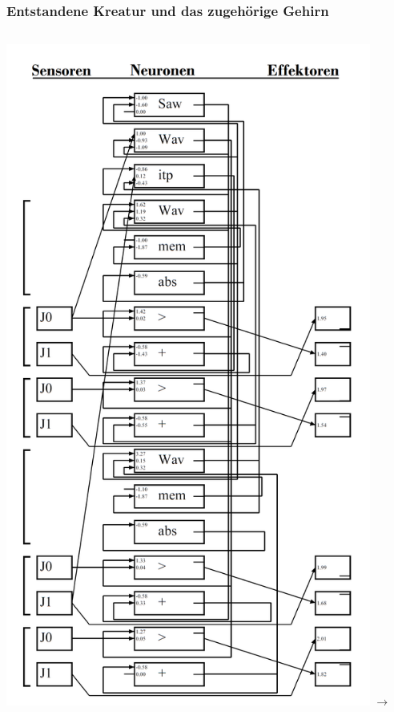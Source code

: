 \documentclass{beamer}
\begin{document}
\begin{frame}
	\frametitle{Entstandene Kreatur und das zugehörige Gehirn}
	\begin{columns}
		\centering
		\includegraphics[width=0.9\textwidth]{img/brain(1).png} \pause
		\centering
		$\longrightarrow$
		\centering

\end{columns}
\end{frame}
\end{document}
